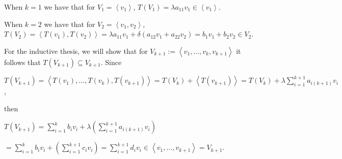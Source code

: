 \documentclass{article}
\theoremstyle{remark}
\begin{document}
\begin{enumerate}
        When $k = 1$ we have that for $V_1 = \left\langle v_1 \right\rangle$, $T(V_1) = \lambda a_{11} v_1 \in \left\langle v_1\right\rangle$.
        
        When $k = 2$ we have that for $V_2 = \left\langle v_1, v_2 \right\rangle$, $T(V_2) = \left\langle T(v_1), T(v_2)\right\rangle = \lambda a_{11}v_1 + \delta(a_{12}v_1 + a_{22}v_2)
        = b_1v_1 + b_2v_2 \in V_2$.


        For the inductive thesis, we will show that for $V_{k+1} := \left\langle v_1, \dots, v_k, v_{k+1}\right\rangle$ 
        it follows that $T(V_{k+1}) \subseteq V_{k+1}$.
        Since 
        \begin{center}
            $T(V_{k+1}) = \left\langle T(v_1), \dots, T(v_k), T(v_{k+1})\right\rangle = T(V_k) + \left\langle T(v_{k+1})\right\rangle =
            T(V_k)+ \lambda \displaystyle \sum_{i=1}^{k+1}a_{i(k+1)}v_{i}$,
        \end{center}
        then
        \begin{center}
            $\displaystyle T(V_{k+1}) = \sum_{i=1}^{k}b_{i}v_{i} + \lambda \left(\sum_{i=1}^{k+1}a_{i(k+1)}v_{i}\right)$
        \end{center}
        \begin{center}
            $\displaystyle = \sum_{i=1}^{k}b_{i}v_{i} + \left(\sum_{i=1}^{k+1}c_{i}v_{i}\right) = \sum_{i=1}^{k+1}d_iv_i \in \left\langle v_1, \dots, v_{k+1}\right\rangle = V_{k+1}$.
        \end{center}


\end{enumerate}
\end{document}
